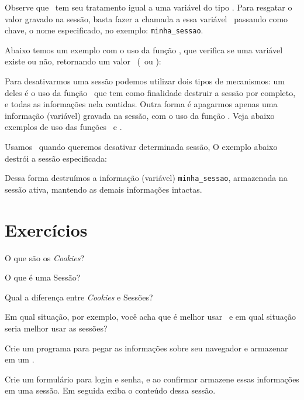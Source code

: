 

Observe que \variavelsession~tem seu tratamento igual a uma variável do tipo \tipoarray. Para resgatar 
o valor gravado na sessão, basta fazer a chamada a essa variável \variavelsession~passando como chave, o nome 
especificado, no exemplo: \texttt{minha\_sessao}.

Abaixo temos um exemplo com o uso da função \funcaoisset, que verifica se uma variável 
existe ou não, retornando um valor \booleano~(\true~ou \false):



Para desativarmos uma sessão podemos utilizar dois tipos de mecanismos: um deles é o uso da função 
\funcaosessiondestroy~que tem como finalidade destruir a sessão por completo, e todas as informações 
nela contidas. Outra forma é apagarmos apenas uma informação (variável) gravada na sessão, 
com o uso da função \funcaounset. Veja abaixo exemplos de uso das funções \funcaosessiondestroy~e
\funcaounset.



Usamos \funcaounset~quando queremos desativar determinada sessão, O exemplo abaixo destrói a 
sessão especificada:



Dessa forma destruímos a informação (variável) \texttt{minha\_sessao}, armazenada na sessão 
ativa, mantendo as demais informações intactas.


\section{Exercícios}
\label{cap10-exercicios}

\begin{description}[labelindent=30pt]
  \item [Q. 01] O que são os \textit{Cookies}?
  \item [Q. 02] O que é uma Sessão? 
  \item [Q. 03] Qual a diferença entre \textit{Cookies} e Sessões?
  \item [Q. 04] Em qual situação, por exemplo, você acha que é melhor usar \cookies~e em qual situação 
  seria melhor usar as sessões?
  \item [Q. 05] Crie um programa para pegar as informações sobre seu navegador e armazenar em um \cookie.
  \item [Q. 06] Crie um formulário para login e senha, e ao confirmar armazene essas informações em uma 
  sessão. Em seguida exiba o conteúdo dessa sessão. 

\end{description}

